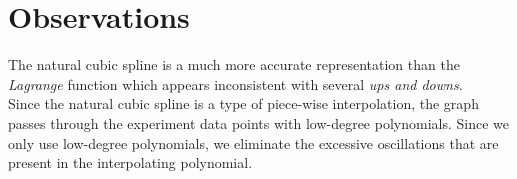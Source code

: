 \documentclass{article}
\begin{document}
\section{Observations}
The natural cubic spline is a much more accurate representation than the {\it Lagrange} function which appears inconsistent with several {\it ups and downs}.\\

Since the natural cubic spline is a type of piece-wise interpolation, the graph passes through the experiment data points with low-degree polynomials. Since we only use low-degree polynomials, we eliminate the excessive oscillations that are present in the interpolating polynomial.
\end{document}
